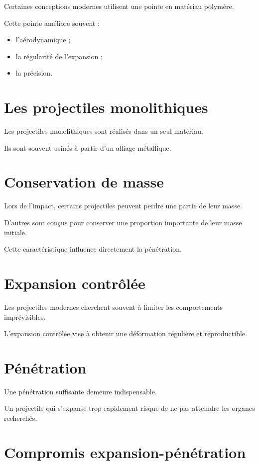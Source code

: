 Certaines conceptions modernes utilisent une pointe en matériau polymère.

Cette pointe améliore souvent :

\begin{itemize}
    \item l'aérodynamique ;
    \item la régularité de l'expansion ;
    \item la précision.
\end{itemize}

\section{Les projectiles monolithiques}

Les projectiles monolithiques sont réalisés dans un seul matériau.

Ils sont souvent usinés à partir d'un alliage métallique.

\section{Conservation de masse}

Lors de l'impact, certains projectiles peuvent perdre une partie de leur
masse.

D'autres sont conçus pour conserver une proportion importante de leur masse
initiale.

Cette caractéristique influence directement la pénétration.

\section{Expansion contrôlée}

Les projectiles modernes cherchent souvent à limiter les comportements
imprévisibles.

L'expansion contrôlée vise à obtenir une déformation régulière et
reproductible.

\section{Pénétration}

Une pénétration suffisante demeure indispensable.

Un projectile qui s'expanse trop rapidement risque de ne pas atteindre les
organes recherchés.

\section{Compromis expansion-pénétration}

